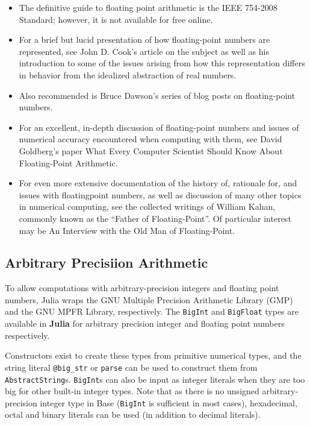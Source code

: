 \documentclass[
]{article}
\providecommand{\tightlist}{%
  \setlength{\itemsep}{0pt}\setlength{\parskip}{0pt}}
\begin{document}
\begin{itemize}
\tightlist
\item
  The definitive guide to floating point arithmetic is the IEEE 754-2008
  Standard; however, it is not available for free online.
\item
  For a brief but lucid presentation of how floating-point numbers are
  represented, see John D. Cook's article on the subject as well as his
  introduction to some of the issues arising from how this
  representation differs in behavior from the idealized abstraction of
  real numbers.
\item
  Also recommended is Bruce Dawson's series of blog posts on
  floating-point numbers.
\item
  For an excellent, in-depth discussion of floating-point numbers and
  issues of numerical accuracy encountered when computing with them, see
  David Goldberg's paper What Every Computer Scientist Should Know About
  Floating-Point Arithmetic.
\item
  For even more extensive documentation of the history of, rationale
  for, and issues with floatingpoint numbers, as well as discussion of
  many other topics in numerical computing, see the collected writings
  of William Kahan, commonly known as the ``Father of Floating-Point''.
  Of particular interest may be An Interview with the Old Man of
  Floating-Point.
\end{itemize}

\hypertarget{arbitrary-precisiion-arithmetic}{%
\subsection{Arbitrary Precisiion
Arithmetic}\label{arbitrary-precisiion-arithmetic}}

To allow computations with arbitrary-precision integers and floating
point numbers, Julia wraps the GNU Multiple Precision Arithmetic Library
(GMP) and the GNU MPFR Library, respectively. The \texttt{BigInt} and
\texttt{BigFloat} types are available in \textbf{Julia} for arbitrary
precision integer and floating point numbers respectively.

Constructors exist to create these types from primitive numerical types,
and the string literal \texttt{@big\_str} or \texttt{parse} can be used
to construct them from \texttt{AbstractString}s. \texttt{BigInt}s can
also be input as integer literals when they are too big for other
built-in integer types. Note that as there is no unsigned
arbitrary-precision integer type in Base (\texttt{BigInt} is sufficient
in most cases), hexadecimal, octal and binary literals can be used (in
addition to decimal literals).
\end{document}
